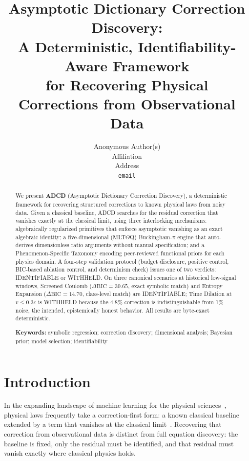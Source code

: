 \documentclass{article}
\title{Asymptotic Dictionary Correction Discovery:\\ A Deterministic, Identifiability-Aware Framework\\
for Recovering Physical Corrections from Observational Data}
\author{%
  Anonymous Author(s) \\
  Affiliation \\
  Address \\
  \texttt{email} \\
}
\begin{document}
\maketitle

\begin{abstract}
We present \textbf{ADCD} (Asymptotic Dictionary Correction Discovery), a
deterministic framework for recovering structured corrections to known physical
laws from noisy data.
Given a classical baseline, ADCD searches for the residual correction that
vanishes exactly at the classical limit, using three interlocking mechanisms:
algebraically regularized primitives that enforce asymptotic vanishing as an
exact algebraic identity; a five-dimensional (MLT$\Theta$Q) Buckingham-$\pi$
engine that auto-derives dimensionless ratio arguments without manual
specification; and a Phenomenon-Specific Taxonomy encoding peer-reviewed
functional priors for each physics domain.
A four-step validation protocol (budget disclosure, positive control, BIC-based
ablation control, and determinism check) issues one of two verdicts:
IDENTIFIABLE or WITHHELD.
On three canonical scenarios at historical low-signal windows, Screened Coulomb
($\Delta\mathrm{BIC}=30.65$, exact symbolic match) and Entropy Expansion
($\Delta\mathrm{BIC}=14.70$, class-level match) are IDENTIFIABLE;
Time Dilation at $v\le0.3c$ is WITHHELD because the $4.8\%$ correction is
indistinguishable from 1\% noise, the intended, epistemically honest behavior.
All results are byte-exact deterministic.

\vspace{0.3em}
\noindent\textbf{Keywords:} symbolic regression; correction discovery;
dimensional analysis; Bayesian prior; model selection; identifiability
\end{abstract}

\section{Introduction}

In the expanding landscape of machine learning for the physical sciences~\cite{carleo2019,wang2023},
physical laws frequently take a correction-first form: a known classical baseline
extended by a term that vanishes at the classical
limit~\cite{einstein1905,debye1923,callen1985}.
Recovering that correction from observational data is distinct from full equation
discovery: the baseline is fixed, only the residual must be identified, and that
residual must vanish exactly where classical physics holds.
\end{document}

